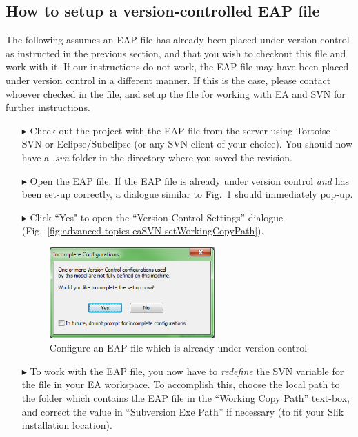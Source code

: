 \subsection{How to setup a version-controlled EAP file}

The following assumes an EAP file has already been placed under version control as instructed in the previous section, and that you wish to checkout this file
and work with it. If our instructions do not work, the EAP file may have been placed under version control in a different manner. If this is the case, please
contact whoever checked in the file, and setup the file for working with EA and SVN for further instructions.

\begin{enumerate}

\item[$\blacktriangleright$] Check-out the project with the EAP file from the server using Tortoise-SVN or Eclipse/Subclipse (or any SVN client of your
choice). You should now have a \textit{.svn} folder in the directory where you saved the revision.

\item[$\blacktriangleright$] Open the EAP file. If the EAP file is already under version control \emph{and} has been set-up correctly, a dialogue similar to
Fig.~\ref{fig:advanced-topics-eaSVN-incompleteConf} should immediately pop-up.

\item[$\blacktriangleright$] Click ``Yes" to open the ``Version Control Settings'' dialogue (Fig.~\ref{fig:advanced-topics-eaSVN-setWorkingCopyPath}).

\begin{figure}[!htbp]
\begin{center}
	\includegraphics[width=0.6\textwidth]{011}
	\caption{Configure an EAP file which is already under version control}
  	\label{fig:advanced-topics-eaSVN-incompleteConf}
\end{center}
\end{figure}

   \item[$\blacktriangleright$] To work with the EAP file, you now have to \emph{redefine} the SVN variable for the file in your EA workspace.
   To accomplish this, choose the local path to the folder which contains the EAP file in the ``Working Copy Path'' text-box, and correct the value in
   ``Subversion Exe Path'' if necessary (to fit your Slik installation location).


\end{enumerate}
